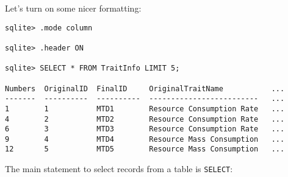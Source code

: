 Let's turn on some nicer formatting:

\begin{lstlisting}
sqlite> .mode column

sqlite> .header ON

sqlite> SELECT * FROM TraitInfo LIMIT 5;

Numbers  OriginalID  FinalID     OriginalTraitName           ... 
-------  ----------  ----------  -------------------------   ...
1        1           MTD1        Resource Consumption Rate   ...
4        2           MTD2        Resource Consumption Rate   ...
6        3           MTD3        Resource Consumption Rate   ...
9        4           MTD4        Resource Mass Consumption   ...
12       5           MTD5        Resource Mass Consumption   ...

\end{lstlisting}
  
The main statement to select records from a table is {\tt SELECT}:
 
